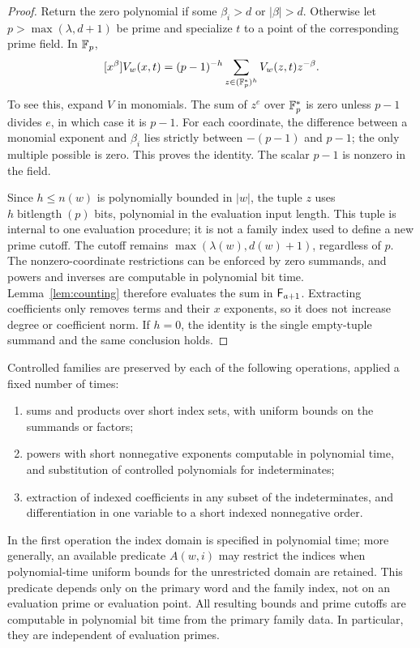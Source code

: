 \begin{proof}
Return the zero polynomial if some $\beta_i>d$ or $|\beta|>d$.
Otherwise let $p>\max(\lambda,d+1)$ be prime and specialize $t$ to a
point of the corresponding prime field.  In $\mathbb F_p$,
\begin{equation}\label{eq:field-coefficient}
 [x^\beta]V_w(x,t)
 =(p-1)^{-h}\sum_{z\in(\mathbb F_p^*)^h} V_w(z,t)z^{-\beta}.
\end{equation}
To see this, expand $V$ in monomials.  The sum of $z^e$ over
$\mathbb F_p^*$ is zero unless $p-1$ divides $e$, in which case it is $p-1$.
For each coordinate, the difference between a monomial exponent and
$\beta_i$ lies strictly between $-(p-1)$ and $p-1$; the only multiple
possible is zero.  This proves the identity.  The scalar $p-1$ is
nonzero in the field.

Since $h\le n(w)$ is polynomially bounded in $|w|$, the tuple $z$
uses $h\operatorname{bitlength}(p)$ bits, polynomial in the evaluation
input length.  This tuple is internal to one evaluation procedure; it
is not a family index used to define a new prime cutoff.  The cutoff
remains $\max(\lambda(w),d(w)+1)$, regardless of $p$.
The nonzero-coordinate restrictions can be enforced by zero summands,
and powers and inverses are computable in polynomial bit time.
Lemma~\ref{lem:counting} therefore evaluates the sum in
$\mathsf F_{a+1}$.  Extracting coefficients only removes terms and their
$x$ exponents, so it does not increase degree or coefficient norm.  If
$h=0$, the identity is the single empty-tuple summand and the same
conclusion holds.
\end{proof}

\begin{proposition}\label{prop:controlled-closure}
Controlled families are preserved by each of the following operations,
applied a fixed number of times:
\begin{enumerate}
\item sums and products over short index sets, with uniform bounds on
the summands or factors;
\item powers with short nonnegative exponents computable in polynomial
time, and substitution of controlled polynomials for indeterminates;
\item extraction of indexed coefficients in any subset of the
indeterminates, and differentiation in one variable to a short indexed
nonnegative order.
\end{enumerate}
In the first operation the index domain is specified in polynomial time;
more generally, an available predicate $A(w,i)$ may restrict the indices
when polynomial-time uniform bounds for the unrestricted domain are
retained.  This predicate depends only on the primary word and the
family index, not on an evaluation prime or evaluation point.  All resulting
bounds and prime cutoffs are computable in polynomial bit time from the
primary family data.  In particular, they are independent of evaluation
primes.
\end{proposition}


